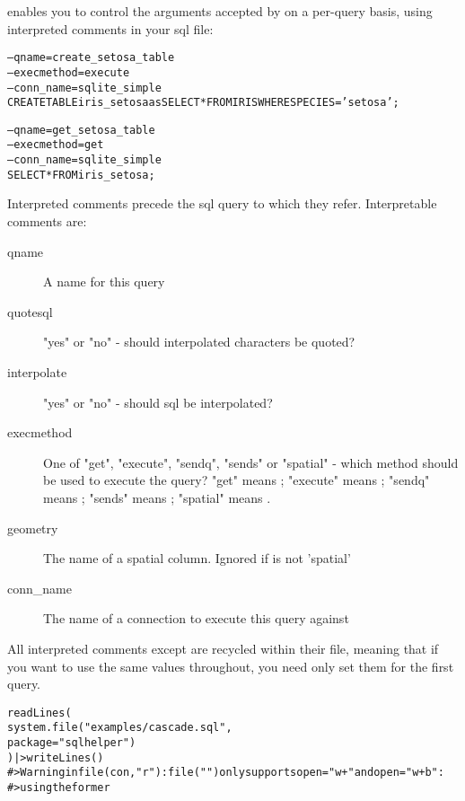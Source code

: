 \documentclass[a4paper]{book}
\begin{document}
\begin{Details}\relax
{} enables you to control the arguments accepted by 
on a per-query basis, using interpreted comments in your sql file:

\begin{alltt}-- qname = create_setosa_table
-- execmethod = execute
-- conn_name = sqlite_simple
CREATE TABLE iris_setosa as SELECT * FROM IRIS WHERE SPECIES = 'setosa';

-- qname = get_setosa_table
-- execmethod = get
-- conn_name = sqlite_simple
SELECT * FROM iris_setosa;
\end{alltt}


Interpreted comments precede the sql query to which they refer. Interpretable
comments are:

\begin{description}

\item[qname] A name for this query
\item[quotesql] "yes" or "no" - should interpolated characters be quoted?
\item[interpolate] "yes" or "no" - should sql be interpolated?
\item[execmethod] One of "get", "execute", "sendq", "sends" or "spatial" -
which method should be used to execute the query? "get" means
; "execute" means ; "sendq" means
; "sends" means ; "spatial"
means .
\item[geometry] The name of a spatial column. Ignored if  is not 'spatial'
\item[conn\_name] The name of a connection to execute this query against

\end{description}


All interpreted comments except  are recycled within their file, meaning
that if you want to use the same values throughout, you need only set them for
the first query.

\begin{alltt}readLines(
  system.file("examples/cascade.sql",
                package="sqlhelper")
) |> writeLines()
#> Warning in file(con, "r"): file("") only supports open = "w+" and open = "w+b":
#> using the former
\end{alltt}

\end{Details}
\end{document}
